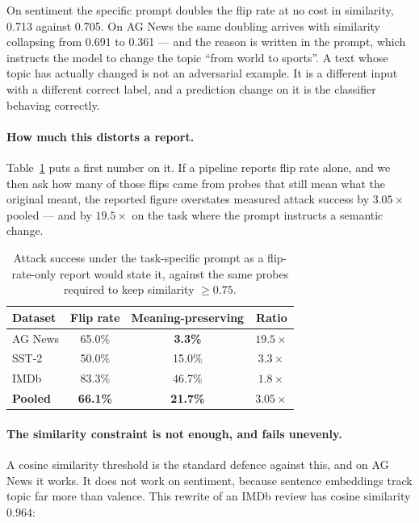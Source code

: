 \documentclass[11pt]{article}
\begin{document}
On sentiment the specific prompt doubles the flip rate at no cost in similarity,
0.713 against 0.705. On AG News the same doubling arrives with similarity
collapsing from 0.691 to 0.361 --- and the reason is written in the prompt, which
instructs the model to change the topic ``from world to sports''. A text whose
topic has actually changed is not an adversarial example. It is a different input
with a different correct label, and a prediction change on it is the classifier
behaving correctly.

\paragraph{How much this distorts a report.}
Table~\ref{tab:overstate} puts a first number on it. If a pipeline reports flip
rate alone, and we then ask how many of those flips came from probes that still
mean what the original meant, the reported figure overstates measured attack
success by $3.05\times$ pooled --- and by $19.5\times$ on the task where the
prompt instructs a semantic change.

\begin{table}[t]
\centering
\small
\begin{tabular}{lccc}
\toprule
Dataset & Flip rate & Meaning-preserving & Ratio \\
\midrule
AG News & 65.0\% & \textbf{3.3\%}  & $19.5\times$ \\
SST-2   & 50.0\% & 15.0\%          & $3.3\times$ \\
IMDb    & 83.3\% & 46.7\%          & $1.8\times$ \\
\midrule
\textbf{Pooled} & \textbf{66.1\%} & \textbf{21.7\%} & $\mathbf{3.05\times}$ \\
\bottomrule
\end{tabular}
\caption{Attack success under the task-specific prompt as a flip-rate-only report
would state it, against the same probes required to keep similarity $\geq 0.75$.}
\label{tab:overstate}
\end{table}

\paragraph{The similarity constraint is not enough, and fails unevenly.}
A cosine similarity threshold is the standard defence against this, and on AG News
it works. It does not work on sentiment, because sentence embeddings track topic
far more than valence. This rewrite of an IMDb review has cosine similarity
$0.964$:
\end{document}
